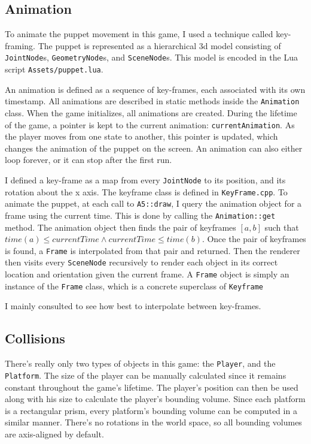 \documentclass[11pt]{report}
\begin{document}
\subsection{Animation}
To animate the puppet movement in this game, I used a technique called key-framing. The puppet is represented as a hierarchical 3d model consisting of \verb|JointNode|s, \verb|GeometryNode|s, and \verb|SceneNode|s. This model is encoded in the Lua script \verb|Assets/puppet.lua|.

An animation is defined as a sequence of key-frames, each associated with its own timestamp. All animations are described in static methods inside the \verb|Animation| class. When the game initializes, all animations are created. During the lifetime of the game, a pointer is kept to the current animation: \verb|currentAnimation|. As the player moves from one state to another, this pointer is updated, which changes the animation of the puppet on the screen. An animation can also either loop forever, or it can stop after the first run.

I defined a key-frame as a map from every \verb|JointNode| to its position, and its rotation about the x axis. The keyframe class is defined in \verb|KeyFrame.cpp|. To animate the puppet, at each call to \verb|A5::draw|, I query the animation object for a frame using the current time. This is done by calling the \verb|Animation::get| method. The animation object then finds the pair of keyframes $[a, b]$ such that $time(a) \leq currentTime \land currentTime \leq time(b)$. Once the pair of keyframes is found, a \verb|Frame| is interpolated from that pair and returned. Then the renderer then visits every \verb|SceneNode| recursively to render each object in its correct location and orientation given the current frame. A \verb|Frame| object is simply an instance of the \verb|Frame| class, which is a concrete superclass of \verb|Keyframe|

I mainly consulted \cite{interactive-computer-graphics} to see how best to interpolate between key-frames.

\subsection{Collisions}
There's really only two types of objects in this game: the \verb|Player|, and the \verb|Platform|. The size of the player can be manually calculated since it remains constant throughout the game's lifetime. The player's position can then be used along with his size to calculate the player's bounding volume. Since each platform is a rectangular prism, every platform's bounding volume can be computed in a similar manner. There's no rotations in the world space, so all bounding volumes are axis-aligned by default.
\end{document}
